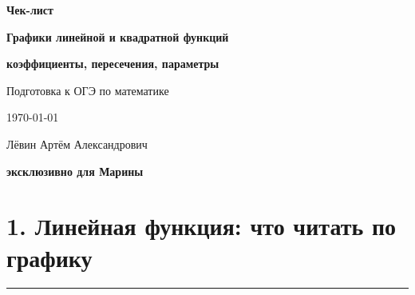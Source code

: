\documentclass[a4paper,12pt]{article}
\newcommand{\sectionline}{%
  \par\noindent
  \color{accent}\rule{\linewidth}{0.5pt}
  \color{black}\par
}
\begin{document}

\begin{titlepage}
\thispagestyle{empty}

\begin{center}

\vspace*{24mm}

{\Large\textcolor{darkaccent}{\textbf{Чек-лист}}}

\vspace{8mm}

{\LARGE\textbf{Графики линейной и квадратной функций}}

\vspace{3mm}

{\Large\textbf{коэффициенты, пересечения, параметры}}

\vspace{15mm}

{\large Подготовка к ОГЭ по математике}

\vspace{18mm}

{\large \today}

\vfill

{\large Лёвин Артём Александрович}

\vspace{2mm}

{\large\textbf{эксклюзивно для Марины}}

\vspace{18mm}


\end{center}
\end{titlepage}


\section*{1. Линейная функция: что читать по графику}
\sectionline
\end{document}

